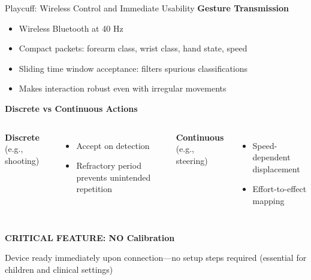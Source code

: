\begin{frame}{Playcuff: Wireless Control and Immediate Usability}
	\textbf{\textcolor{gbAqua}{Gesture Transmission}}
	
	\begin{itemize}
		\item Wireless Bluetooth at 40 Hz
		\item Compact packets: forearm class, wrist class, hand state, speed
		\item Sliding time window acceptance: filters spurious classifications
		\item Makes interaction robust even with irregular movements
	\end{itemize}
	
	\vspace{0.3cm}
	
	\textbf{\textcolor{gbAqua}{Discrete vs Continuous Actions}}
	
	\begin{columns}[t]
		\textbf{Discrete} (e.g., shooting)
		
		\begin{itemize}
			\item Accept on detection
			\item Refractory period prevents unintended repetition
		\end{itemize}
		
		\textbf{Continuous} (e.g., steering)
		
		\begin{itemize}
			\item Speed-dependent displacement
			\item Effort-to-effect mapping
		\end{itemize}
	\end{columns}
	
	\vspace{0.3cm}
	
	\textbf{\textcolor{gbAqua}{CRITICAL FEATURE: NO Calibration}}
	
	Device ready immediately upon connection—no setup steps required (essential for children and clinical settings)
\end{frame}

